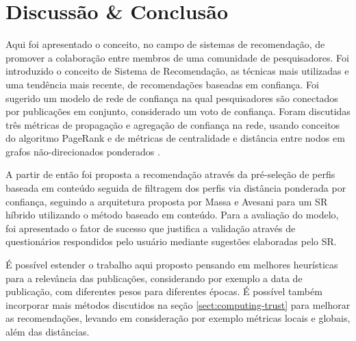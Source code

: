 \documentclass[12pt]{article}
\begin{document}
\section{Discussão \& Conclusão}

Aqui foi apresentado o conceito, no campo de sistemas de recomendação, de promover a colaboração entre membros de uma comunidade 
de pesquisadores. Foi introduzido o conceito de Sistema de Recomendação, as técnicas mais utilizadas e uma tendência mais recente, 
de recomendações baseadas em confiança. Foi sugerido um modelo de rede de confiança na qual pesquisadores são conectados por  
publicações em conjunto, considerado um voto de confiança. Foram discutidas três métricas de propagação e agregação de confiança 
na rede, usando conceitos do algoritmo PageRank \cite{page1999pagerank} e de métricas de centralidade e distância entre nodos em grafos 
não-direcionados ponderados \cite{opsahl2010node}.

A partir de então foi proposta a recomendação através da pré-seleção de perfis baseada em conteúdo seguida de filtragem dos perfis 
via distância ponderada por confiança, seguindo a arquitetura proposta por Massa e Avesani \cite{massa2004trust} para um SR híbrido 
utilizando o método baseado em conteúdo. Para a avaliação do modelo, foi apresentado o fator de sucesso que justifica a validação 
através de questionários respondidos pelo usuário mediante sugestões elaboradas pelo SR.

É possível estender o trabalho aqui proposto pensando em melhores heurísticas para a relevância das publicações, considerando por 
exemplo a data de publicação, com diferentes pesos para diferentes épocas. É possível também incorporar mais métodos discutidos 
na seção \ref{sect:computing-trust} para melhorar as recomendações, levando em consideração por exemplo métricas locais e globais, 
além das distâncias.



\end{document}
